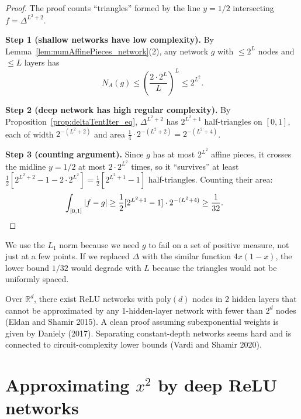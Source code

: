 \begin{proof}
  The proof counts ``triangles'' formed by the line $y = 1/2$ intersecting $f = \Delta^{L^2+2}$.

  \textbf{Step 1 (shallow networks have low complexity).}
  By Lemma~\ref{lem:numAffinePieces_network}(2), any network $g$ with $\leq 2^L$ nodes and $\leq L$
  layers has
  \[
    N_A(g) \leq \left(\frac{2 \cdot 2^L}{L}\right)^L \leq 2^{L^2}.
  \]

  \textbf{Step 2 (deep network has high regular complexity).}
  By Proposition~\ref{prop:deltaTentIter_eq}, $\Delta^{L^2+2}$ has $2^{L^2+1}$ half-triangles on
  $[0,1]$, each of width $2^{-(L^2+2)}$ and area $\frac{1}{4} \cdot 2^{-(L^2+2)} = 2^{-(L^2+4)}$.

  \textbf{Step 3 (counting argument).}
  Since $g$ has at most $2^{L^2}$ affine pieces, it crosses the midline $y = 1/2$ at most
  $2 \cdot 2^{L^2}$ times, so it ``survives'' at least
  $\frac{1}{2}[2^{L^2+2} - 1 - 2 \cdot 2^{L^2}] = \frac{1}{2}[2^{L^2+1} - 1]$ half-triangles.
  Counting their area:
  \[
    \int_{[0,1]} |f - g| \geq \frac{1}{2}[2^{L^2+1}-1] \cdot 2^{-(L^2+4)}
    \geq \frac{1}{32}.\qquad\qedhere
  \]
\end{proof}

\begin{remark}\label{rem:L1_norm}
  We use the $L_1$ norm because we need $g$ to fail on a set of positive measure,
  not just at a few points. If we replaced $\Delta$ with the similar function $4x(1-x)$,
  the lower bound $1/32$ would degrade with $L$ because the triangles would not be
  uniformly spaced.
\end{remark}

\begin{remark}\label{rem:other_separations}
  Over $\mathbb{R}^d$, there exist ReLU networks with $\mathrm{poly}(d)$ nodes in 2 hidden layers
  that cannot be approximated by any 1-hidden-layer network with fewer than $2^d$ nodes
  (Eldan and Shamir 2015). A clean proof assuming subexponential weights is given by
  Daniely (2017). Separating constant-depth networks seems hard and is connected to
  circuit-complexity lower bounds (Vardi and Shamir 2020).
\end{remark}

\section{Approximating \texorpdfstring{$x^2$}{x²} by deep ReLU networks}\label{sec:square}

